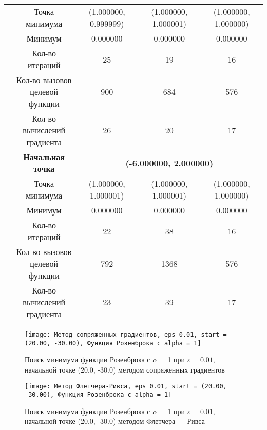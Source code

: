 \begin{table}[H]
\begin{tabular}{|c|c|c|c|c|}
	\cline{2-5}
	&Точка минимума &(1.000000, 0.999999) &(1.000000, 1.000001) &(1.000000, 1.000000) \\ 
	\cline{2-5}
	&Минимум &0.000000 &0.000000 &0.000000 \\ 
	\cline{2-5}
	&Кол-во итераций &25 &19 &16 \\ 
	\cline{2-5}
	&\makecell{Кол-во вызовов\\целевой функции} &900 &684 &576 \\ 
	\cline{2-5}
	&\makecell{Кол-во вычислений\\градиента} &26 &20 &17 \\ 
	\cline{2-5}
\cline{2-5}&\textbf{Начальная точка} &\multicolumn{3}{c|}{\textbf{(-6.000000, 2.000000)}}\\
	\cline{2-5}
	&Точка минимума &(1.000000, 1.000001) &(1.000000, 1.000001) &(1.000000, 1.000000) \\ 
	\cline{2-5}
	&Минимум &0.000000 &0.000000 &0.000000 \\ 
	\cline{2-5}
	&Кол-во итераций &22 &38 &16 \\ 
	\cline{2-5}
	&\makecell{Кол-во вызовов\\целевой функции} &792 &1368 &576 \\ 
	\cline{2-5}
	&\makecell{Кол-во вычислений\\градиента} &23 &39 &17 \\ 
	\cline{2-5}
	\hline

\end{tabular}
\end{table}


            \begin{figure}[H]
	        \centering
	        \texttt{[image: Метод сопряженных градиентов, eps 0.01, start = (20.00, -30.00), Функция Розенброка с alpha = 1]}%
	        \caption{Поиск минимума функции Розенброка с $\alpha$ = 1 при $\varepsilon = 0.01$, начальной точке (20.0, -30.0) методом сопряженных градиентов}
	        \vspace*{-1.2cm}
            \end{figure}
            
            \begin{figure}[H]
	        \centering
	        \texttt{[image: Метод Флетчера-Ривса, eps 0.01, start = (20.00, -30.00), Функция Розенброка с alpha = 1]}%
	        \caption{Поиск минимума функции Розенброка с $\alpha$ = 1 при $\varepsilon = 0.01$, начальной точке (20.0, -30.0) методом Флетчера --- Ривса}
	        \vspace*{-1.2cm}
            \end{figure}
            
